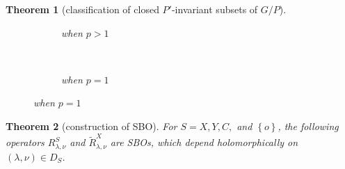 \documentclass[portrait,final,paperwidth=90cm,paperheight=120cm,fontscale=0.3]{baposter}
\newtheorem{theorem}{Theorem}
\theoremstyle{definition}
\begin{document}
\begin{poster}
{\begin{theorem}[classification of closed $P'$-invariant subsets of $G/P$]
	\vspace*{-0.5cm}
  \begin{figure}[H]
    \centering
    \begin{subfigure}[t]{0.3\textwidth}
	    \xymatrixrowsep{0.5pc}
	\caption{when $p>1$}
    \end{subfigure}
    ~ %
    \begin{subfigure}[t]{0.3\textwidth}
	    \xymatrixrowsep{0.5pc}
	    {}
	\caption{when $p=1$}
    \end{subfigure}
\end{figure}
\end{theorem}
 }
 {
\begin{theorem}[construction of SBO]\label{thm:construction}
	For $S=X,Y,C,$ and $\left\{ o \right\}$, the following operators $R_{\lambda,\nu}^S$ and $\tilde{R}_{\lambda,\nu}^X$ are SBOs, which depend holomorphically on $(\lambda,\nu)\in D_S$. 
	

\end{theorem}}
\end{poster}
\end{document}
